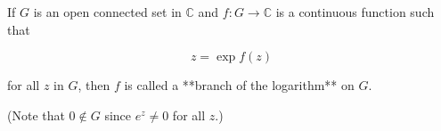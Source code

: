 If $G$ is an open connected set in $\mathbb{C}$ and $f: G \to \mathbb{C}$ is a continuous function such that

$$z = \exp f(z)$$

for all $z$ in $G$, then $f$ is called a **branch of the logarithm** on $G$.

(Note that $0 \notin G$ since $e^z \neq 0$ for all $z$.)

